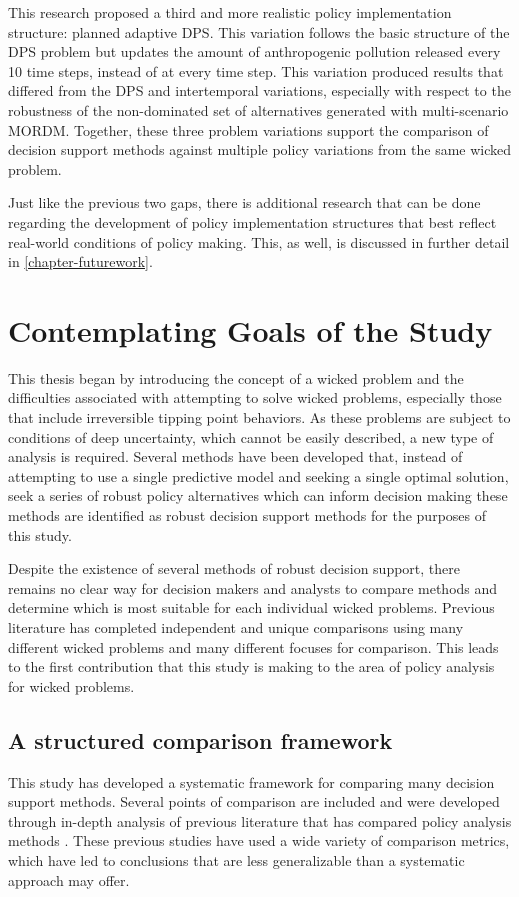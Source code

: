     This research proposed a third and more realistic policy implementation structure: planned adaptive DPS. This variation follows the basic structure of the DPS problem but updates the amount of anthropogenic pollution released every 10 time steps, instead of at every time step. This variation produced results that differed from the DPS and intertemporal variations, especially with respect to the robustness of the non-dominated set of alternatives generated with multi-scenario MORDM. Together, these three problem variations support the comparison of decision support methods against multiple policy variations from the same wicked problem. 
    
    Just like the previous two gaps, there is additional research that can be done regarding the development of policy implementation structures that best reflect real-world conditions of policy making. This, as well, is discussed in further detail in \cref{chapter-futurework}.
    
\section{Contemplating Goals of the Study} \label{reflect-goals}
This thesis began by introducing the concept of a wicked problem and the difficulties associated with attempting to solve wicked problems, especially those that include irreversible tipping point behaviors. As these problems are subject to conditions of deep uncertainty, which cannot be easily described, a new type of analysis is required. Several methods have been developed that, instead of attempting to use a single predictive model and seeking a single optimal solution, seek a series of robust policy alternatives which can inform decision making these methods are identified as robust decision support methods for the purposes of this study. 

Despite the existence of several methods of robust decision support, there remains no clear way for decision makers and analysts to compare methods and determine which is most suitable for each individual wicked problems. Previous literature has completed independent and unique comparisons using many different wicked problems and many different focuses for comparison. This leads to the first contribution that this study is making to the area of policy analysis for wicked problems.

    \subsection{A structured comparison framework}
    This study has developed a systematic framework for comparing many decision support methods. Several points of comparison are included and were developed through in-depth analysis of previous literature that has compared policy analysis methods \citep{Gersonius2016,Hall2012,Matrosov2013a,Roach2015}. These previous studies have used a wide variety of comparison metrics, which have led to conclusions that are less generalizable than a systematic approach may offer. 
    
